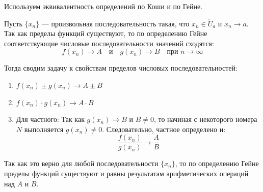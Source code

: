 \begin{tcolorbox}[title=Доказательство (через Гейне)]
	Используем эквивалентность определений по Коши и по Гейне.
	
	Пусть $\{x_n\}$ — произвольная последовательность такая, что $x_n \in \mathring{U}_a$ и $x_n \to a$.
	Так как пределы функций существуют, то по определению Гейне соответствующие числовые последовательности значений сходятся:
	\[ f(x_n) \to A \quad \text{и} \quad g(x_n) \to B \quad \text{при } n \to \infty \]
	
	Тогда сводим задачу к свойствам пределов числовых последовательностей:
	\begin{enumerate}
		\item $f(x_n) \pm g(x_n) \to A \pm B$
		\item $f(x_n) \cdot g(x_n) \to A \cdot B$
		\item Для частного:
		Так как $g(x_n) \to B$ и $B \neq 0$, то начиная с некоторого номера $N$ выполняется $g(x_n) \neq 0$. Следовательно, частное определено и:
		\[ \frac{f(x_n)}{g(x_n)} \to \frac{A}{B} \]
	\end{enumerate}
	
	Так как это верно для любой последовательности $\{x_n\}$, то по определению Гейне пределы функций существуют и равны результатам арифметических операций над $A$ и $B$.
\end{tcolorbox}

